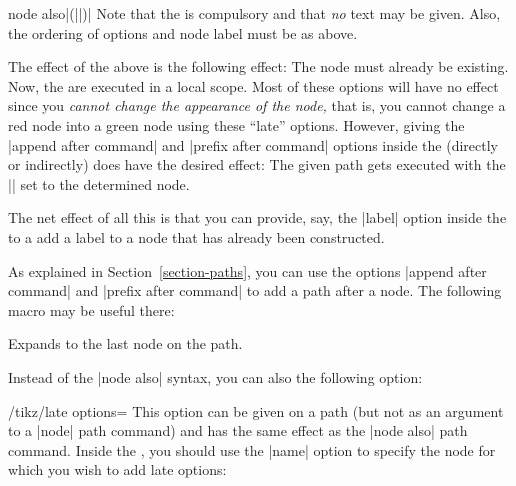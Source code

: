\begin{pathoperation}{node also}{|(||)|}
  Note that the  is compulsory and that \emph{no} text may
  be given. Also, the ordering of options and node label must be as above.
  
  The effect of the above is the following effect: The node
   must already  be existing. Now, the  are
  executed in a local scope. Most of these options will have no effect
  since you \emph{cannot change the appearance of the node,} that is,
  you cannot change a red node into a green node using these ``late''
  options. However, giving the |append after command| and
  |prefix after command| options inside
  the  (directly or indirectly) does have the desired
  effect: The given path gets executed with the |\tikzlastnode|
  set to the determined node.

  The net effect of all this is that you can provide, say, the |label|
  option inside the  to a add a label to a node that has
  already been constructed.
  
\begin{codeexample}[]
\end{codeexample}
\end{pathoperation}

As explained in Section~\ref{section-paths}, you
can use the options |append after command| and
|prefix after command| to add a path after a node. The following macro may be
useful there:
\begin{command}{\tikzlastnode}
  Expands to the last node on the path.
\end{command}

Instead of the |node also| syntax, you can also the following option:

\begin{key}{/tikz/late options=}
  This option can be given on a path (but not as an argument to a
  |node| path command) and has the same effect as the |node also| path
  command. Inside the , you should use the |name| option
  to specify the node for which you wish to add late options:
 
\begin{codeexample}[]
\end{codeexample}
\end{key}


